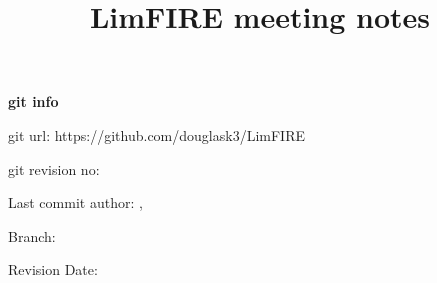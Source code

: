 \documentclass[12pt]{article}
\title{LimFIRE meeting notes}
\author{ }
\begin{document}
\maketitle

\begin{center}
    \textbf{git info}

        git url: https://github.com/douglask3/LimFIRE

	    git revision no: \gitAbbrevHash

        Last commit author: \gitAuthorName,  \gitAuthorEmail

	    Branch: \gitReferences

	    Revision Date: \gitAuthorIsoDate
\end{center}
\newpage


\end{document}
